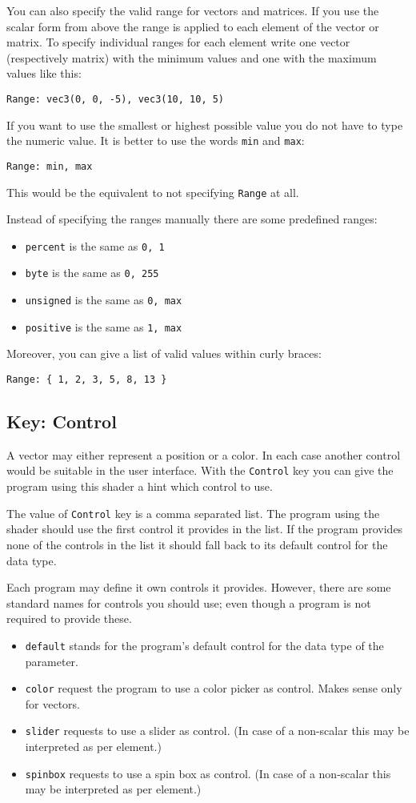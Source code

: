 \documentclass[11pt,a4paper]{scrreprt}
\newcommand{\key}[1]{\subsection{Key: #1}}
\begin{document}
You can also specify the valid range for vectors and matrices. If you use the 
scalar form from above the range is applied to each element of the vector or 
matrix. To specify individual ranges for each element write one vector 
(respectively matrix) with the minimum values and one with the maximum values 
like this:
\begin{lstlisting}
Range: vec3(0, 0, -5), vec3(10, 10, 5)
\end{lstlisting}

If you want to use the smallest or highest possible value you do not have to 
type the numeric value. It is better to use the words \lstinline$min$ and 
\lstinline$max$:
\begin{lstlisting}
Range: min, max
\end{lstlisting}
This would be the equivalent to not specifying \lstinline$Range$ at all.

Instead of specifying the ranges manually there are some predefined ranges:
\begin{itemize}
    \item \verb$percent$ is the same as \lstinline$0, 1$
    \item \verb$byte$ is the same as \lstinline$0, 255$
    \item \verb$unsigned$ is the same as \lstinline$0, max$
    \item \verb$positive$ is the same as \lstinline$1, max$
\end{itemize}

Moreover, you can give a list of valid values within curly braces:
\begin{lstlisting}
Range: { 1, 2, 3, 5, 8, 13 }
\end{lstlisting}

\key{Control}
A vector may either represent a position or a color. In each case another 
control would be suitable in the user interface. With the \lstinline$Control$ 
key you can give the program using this shader a hint which control to use.

The value of \lstinline$Control$ key is a comma separated list. The program 
using the shader should use the first control it provides in the list. If the 
program provides none of the controls in the list it should fall back to its 
default control for the data type.

Each program may define it own controls it provides. However, there are some 
standard names for controls you should use; even though a program is not 
required to provide these.
\begin{itemize}
    \item \verb$default$ stands for the program's default control for the data 
        type of the parameter.
    \item \verb$color$ request the program to use a color picker as control.  
        Makes sense only for vectors.
    \item \verb$slider$ requests to use a slider as control. (In case of 
        a non-scalar this may be interpreted as per element.)
    \item \verb$spinbox$ requests to use a spin box as control. (In case of 
        a non-scalar this may be interpreted as per element.)
\end{itemize}
\end{document}
